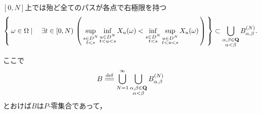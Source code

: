  	\begin{itembox}[l]{$[0,N]$上では殆ど全てのパスが各点で右極限を持つ}
 		\begin{align}
 			\left\{\, \omega \in \Omega \mid \quad \exists t \in [0,N)\, \left(\, 
 			\operatorname*{sup}_{\substack{s \in D^N \\ t < s}} \operatorname*{inf}_{\substack{u \in D^N \\ t < u < s}} X_u(\omega) 
 			< \operatorname*{inf}_{\substack{s \in D^N \\ t < s}} \operatorname*{sup}_{\substack{u \in D^N \\ t < u < s}} X_u(\omega)\, \right)\, \right\}
 			\subset \bigcup_{\substack{\alpha,\beta \in \mathbf{Q} \\ \alpha < \beta}} B_{\alpha,\beta}^{(N)}.
 		\end{align}
 	\end{itembox}
 	
 	ここで
 	\begin{align}
 		B \defeq \bigcup_{N=1}^\infty \bigcup_{\substack{\alpha,\beta \in \Q \\ \alpha < \beta}} B_{\alpha,\beta}^{(N)}
 	\end{align}
 	とおけば$B$は$P$-零集合であって，